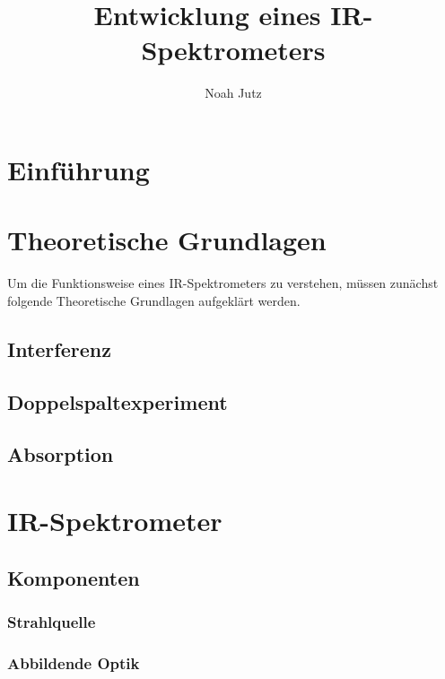 \documentclass{article}
\title{Entwicklung eines IR-Spektrometers}
\author{Noah Jutz}
\date{}
\begin{document}
\maketitle
\tableofcontents

\newpage
\section{Einführung}


\newpage
\section{Theoretische Grundlagen}
Um die Funktionsweise eines IR-Spektrometers zu verstehen, müssen zunächst folgende Theoretische Grundlagen aufgeklärt werden.

\subsection{Interferenz}


\newpage
\subsection{Doppelspaltexperiment}


\newpage
\subsection{Absorption}


\newpage
\section{IR-Spektrometer}

\subsection{Komponenten}

\subsubsection{Strahlquelle}


\subsubsection{Abbildende Optik}
\end{document}
